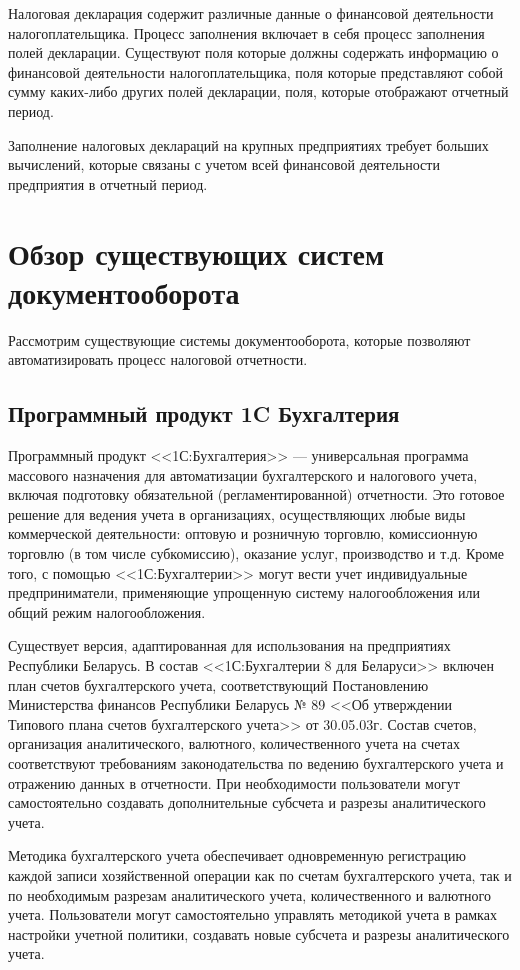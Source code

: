 \documentclass[14pt,a4paper]{reportmod}
\begin{document}
Налоговая декларация содержит различные данные о финансовой деятельности налогоплательщика. Процесс заполнения включает в себя процесс заполнения полей декларации. Существуют поля которые должны содержать информацию о финансовой деятельности налогоплательщика, поля которые представляют собой сумму каких-либо других полей декларации, поля, которые отображают отчетный период.

Заполнение налоговых деклараций на крупных предприятиях требует больших вычислений, которые связаны с учетом всей финансовой деятельности предприятия в отчетный период.
\section{Обзор существующих систем документооборота}
Рассмотрим существующие системы документооборота, которые позволяют автоматизировать процесс налоговой отчетности.
\subsection{Программный продукт 1C Бухгалтерия}
Программный продукт <<1С:Бухгалтерия>> — универсальная программа массового назначения для автоматизации бухгалтерского и налогового учета, включая подготовку обязательной (регламентированной) отчетности. Это готовое решение для ведения учета в организациях, осуществляющих любые виды коммерческой деятельности: оптовую и розничную торговлю, комиссионную торговлю (в том числе субкомиссию), оказание услуг, производство и т.д. Кроме того, с помощью <<1С:Бухгалтерии>> могут вести учет индивидуальные предприниматели, применяющие упрощенную систему налогообложения или общий режим налогообложения.


Существует версия, адаптированная для использования на предприятиях Республики Беларусь. В состав <<1С:Бухгалтерии 8 для Беларуси>> включен план счетов бухгалтерского учета, соответствующий Постановлению Министерства финансов Республики Беларусь № 89 <<Об утверждении Типового плана счетов бухгалтерского учета>> от 30.05.03г.  Состав счетов, организация аналитического, валютного, количественного учета на счетах соответствуют требованиям законодательства по ведению бухгалтерского учета и отражению данных в отчетности. При необходимости пользователи могут самостоятельно создавать дополнительные субсчета и разрезы аналитического учета.


Методика бухгалтерского учета обеспечивает одновременную регистрацию каждой записи хозяйственной операции как по счетам бухгалтерского учета, так и по необходимым разрезам аналитического учета, количественного и валютного учета. Пользователи могут самостоятельно управлять методикой учета в рамках настройки учетной политики, создавать новые субсчета и разрезы аналитического учета.
\end{document}
